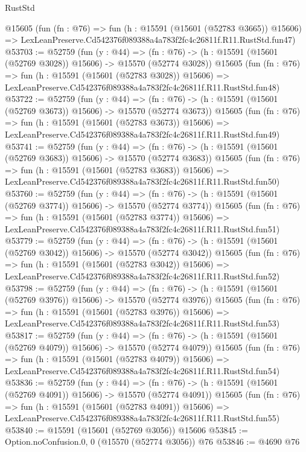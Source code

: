 \begin{lexlean}{RustStd}
\begin{coremodule}
    @15605
    (fun (fn : @76) =>
    fun (h : @15591 (@15601 (@52783 @3665)) @15606) =>
    LexLeanPreserve.Cd542376f089388a4a783f2fc4c26811f.R11.RustStd.fun47)
@53703 := @52759
    (fun (y : @44) =>
    (fn : @76) -> (h : @15591 (@15601 (@52769 @3028)) @15606) -> @15570 (@52774 @3028))
    @15605
    (fun (fn : @76) =>
    fun (h : @15591 (@15601 (@52783 @3028)) @15606) =>
    LexLeanPreserve.Cd542376f089388a4a783f2fc4c26811f.R11.RustStd.fun48)
@53722 := @52759
    (fun (y : @44) =>
    (fn : @76) -> (h : @15591 (@15601 (@52769 @3673)) @15606) -> @15570 (@52774 @3673))
    @15605
    (fun (fn : @76) =>
    fun (h : @15591 (@15601 (@52783 @3673)) @15606) =>
    LexLeanPreserve.Cd542376f089388a4a783f2fc4c26811f.R11.RustStd.fun49)
@53741 := @52759
    (fun (y : @44) =>
    (fn : @76) -> (h : @15591 (@15601 (@52769 @3683)) @15606) -> @15570 (@52774 @3683))
    @15605
    (fun (fn : @76) =>
    fun (h : @15591 (@15601 (@52783 @3683)) @15606) =>
    LexLeanPreserve.Cd542376f089388a4a783f2fc4c26811f.R11.RustStd.fun50)
@53760 := @52759
    (fun (y : @44) =>
    (fn : @76) -> (h : @15591 (@15601 (@52769 @3774)) @15606) -> @15570 (@52774 @3774))
    @15605
    (fun (fn : @76) =>
    fun (h : @15591 (@15601 (@52783 @3774)) @15606) =>
    LexLeanPreserve.Cd542376f089388a4a783f2fc4c26811f.R11.RustStd.fun51)
@53779 := @52759
    (fun (y : @44) =>
    (fn : @76) -> (h : @15591 (@15601 (@52769 @3042)) @15606) -> @15570 (@52774 @3042))
    @15605
    (fun (fn : @76) =>
    fun (h : @15591 (@15601 (@52783 @3042)) @15606) =>
    LexLeanPreserve.Cd542376f089388a4a783f2fc4c26811f.R11.RustStd.fun52)
@53798 := @52759
    (fun (y : @44) =>
    (fn : @76) -> (h : @15591 (@15601 (@52769 @3976)) @15606) -> @15570 (@52774 @3976))
    @15605
    (fun (fn : @76) =>
    fun (h : @15591 (@15601 (@52783 @3976)) @15606) =>
    LexLeanPreserve.Cd542376f089388a4a783f2fc4c26811f.R11.RustStd.fun53)
@53817 := @52759
    (fun (y : @44) =>
    (fn : @76) -> (h : @15591 (@15601 (@52769 @4079)) @15606) -> @15570 (@52774 @4079))
    @15605
    (fun (fn : @76) =>
    fun (h : @15591 (@15601 (@52783 @4079)) @15606) =>
    LexLeanPreserve.Cd542376f089388a4a783f2fc4c26811f.R11.RustStd.fun54)
@53836 := @52759
    (fun (y : @44) =>
    (fn : @76) -> (h : @15591 (@15601 (@52769 @4091)) @15606) -> @15570 (@52774 @4091))
    @15605
    (fun (fn : @76) =>
    fun (h : @15591 (@15601 (@52783 @4091)) @15606) =>
    LexLeanPreserve.Cd542376f089388a4a783f2fc4c26811f.R11.RustStd.fun55)
@53840 := @15591 (@15601 (@52769 @3056)) @15606
@53845 := Option.noConfusion.{0, 0} (@15570 (@52774 @3056)) @76
@53846 := @4690 @76

\end{coremodule}
\end{lexlean}
